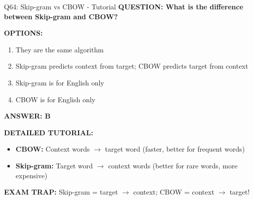 \documentclass[8pt]{beamer}
\begin{document}
	\begin{frame}{Q64: Skip-gram vs CBOW - Tutorial}
		\fontsize{6.5}{7.5}\selectfont
		\textbf{QUESTION: What is the difference between Skip-gram and CBOW?}
		
		\vspace{0.1cm}
		\textbf{OPTIONS:}
		\begin{enumerate}
			\item They are the same algorithm
			\item Skip-gram predicts context from target; CBOW predicts target from context
			\item Skip-gram is for English only
			\item CBOW is for English only
		\end{enumerate}
		
		\vspace{0.1cm}
		\textcolor{myblue}{\textbf{ANSWER: B}}
		
		\vspace{0.1cm}
		\textbf{DETAILED TUTORIAL:}
		\begin{itemize}
			\item \textbf{CBOW:} Context words $\to$ target word (faster, better for frequent words)
			\item \textbf{Skip-gram:} Target word $\to$ context words (better for rare words, more expensive)
		\end{itemize}
		
		\textcolor{myred}{\textbf{EXAM TRAP:}} Skip-gram = \textcolor{myblue}{target $\to$ context}; CBOW = \textcolor{myblue}{context $\to$ target}!
	\end{frame}
	
\end{document}
